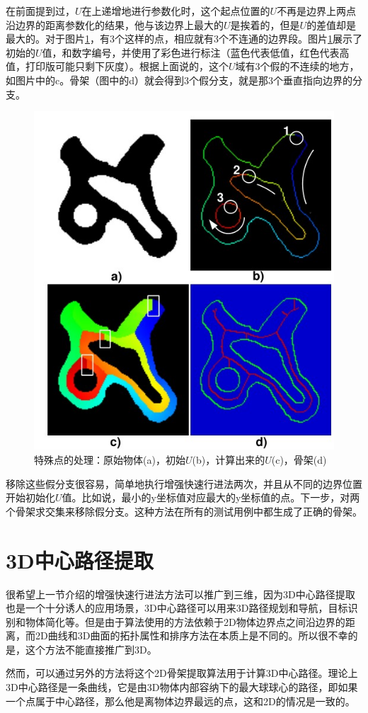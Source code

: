 在前面提到过，$U$在上递增地进行参数化时，这个起点位置的$U$不再是边界上两点沿边界的距离参数化的结果，他与该边界上最大的$U$是挨着的，但是$U$的差值却是最大的。对于图片\ref{special_points}，有3个这样的点，相应就有3个不连通的边界段。图片\ref{special_points}展示了初始的$U$值，和数字编号，并使用了彩色进行标注（蓝色代表低值，红色代表高值，打印版可能只剩下灰度）。根据上面说的，这个$U$域有3个假的不连续的地方，如图片中的c。骨架（图中的d）就会得到3个假分支，就是那3个垂直指向边界的分支。
\begin{figure}[h!]
    \centering
    \includegraphics[height=250bp]{figure/special_points.png}
    \caption{特殊点的处理：原始物体(a)，初始$U$(b)，计算出来的$U$(c)，骨架(d)}
    \label{special_points}
\end{figure}

移除这些假分支很容易，简单地执行增强快速行进法两次，并且从不同的边界位置开始初始化$U$值。比如说，最小的y坐标值对应最大的y坐标值的点。下一步，对两个骨架求交集来移除假分支。这种方法在所有的测试用例中都生成了正确的骨架。

\section{3D中心路径提取}
\label{afmm-3D}
很希望上一节介绍的增强快速行进法方法可以推广到三维，因为3D中心路径提取也是一个十分诱人的应用场景，3D中心路径可以用来3D路径规划和导航，目标识别和物体简化等。但是由于算法使用的方法依赖于2D物体边界点之间沿边界的距离，而2D曲线和3D曲面的拓扑属性和排序方法在本质上是不同的。所以很不幸的是，这个方法不能直接推广到3D。

然而，可以通过另外的方法将这个2D骨架提取算法用于计算3D中心路径。理论上3D中心路径是一条曲线，它是由3D物体内部容纳下的最大球球心的路径，即如果一个点属于中心路径，那么他是离物体边界最远的点，这和2D的情况是一致的。

